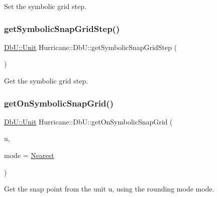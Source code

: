 Set the symbolic grid step. \mbox{\label{group__DbUGroup_ga687a9134729b107c42fb7f69596c4c3b}} 
\subsubsection{\texorpdfstring{get\+Symbolic\+Snap\+Grid\+Step()}{getSymbolicSnapGridStep()}}
{\footnotesize\ttfamily \mbox{\hyperlink{group__DbUGroup_ga4fbfa3e8c89347af76c9628ea06c4146}{Db\+U\+::\+Unit}} Hurricane\+::\+Db\+U\+::get\+Symbolic\+Snap\+Grid\+Step (\begin{DoxyParamCaption}{ }\end{DoxyParamCaption})\hspace{0.3cm}{\ttfamily [static]}}

Get the symbolic grid step. \mbox{\label{group__DbUGroup_gad1b0c0f3680093cf5a63d901312c925d}} 
\subsubsection{\texorpdfstring{get\+On\+Symbolic\+Snap\+Grid()}{getOnSymbolicSnapGrid()}}
{\footnotesize\ttfamily \mbox{\hyperlink{group__DbUGroup_ga4fbfa3e8c89347af76c9628ea06c4146}{Db\+U\+::\+Unit}} Hurricane\+::\+Db\+U\+::get\+On\+Symbolic\+Snap\+Grid (\begin{DoxyParamCaption}\item[{\mbox{\hyperlink{group__DbUGroup_ga4fbfa3e8c89347af76c9628ea06c4146}{Db\+U\+::\+Unit}}}]{u,  }\item[{\mbox{\hyperlink{group__DbUGroup_ga1082168d6f9956ebba22ab8bbec21637}{Db\+U\+::\+Snap\+Mode}}}]{mode = {\ttfamily \mbox{\hyperlink{group__DbUGroup_gga1082168d6f9956ebba22ab8bbec21637a65e6f47eb16779b8974a80d6145a2db5}{Nearest}}} }\end{DoxyParamCaption})\hspace{0.3cm}{\ttfamily [static]}}

Get the snap point from the unit {\ttfamily u}, using the rounding mode {\ttfamily mode}. \mbox{\label{group__DbUGroup_ga87323d9038656dceabffc37d45de408a}} 
